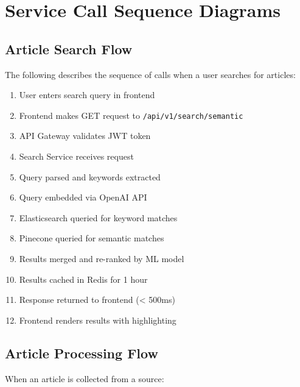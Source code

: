 \documentclass[12pt,a4paper]{report}
\begin{document}
\section{Service Call Sequence Diagrams}

\subsection{Article Search Flow}

The following describes the sequence of calls when a user searches for articles:

\begin{enumerate}
    \item User enters search query in frontend
    \item Frontend makes GET request to \texttt{/api/v1/search/semantic}
    \item API Gateway validates JWT token
    \item Search Service receives request
    \item Query parsed and keywords extracted
    \item Query embedded via OpenAI API
    \item Elasticsearch queried for keyword matches
    \item Pinecone queried for semantic matches
    \item Results merged and re-ranked by ML model
    \item Results cached in Redis for 1 hour
    \item Response returned to frontend (< 500ms)
    \item Frontend renders results with highlighting
\end{enumerate}

\subsection{Article Processing Flow}

When an article is collected from a source:
\end{document}
